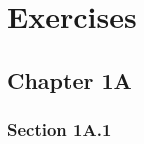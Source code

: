 \chapter{Exercises}
\label{+++ Chpt: Exercises} %


\section{Chapter 1A} \label{- Sec: Exercises 1A} 

\subsection{Section 1A.1} \label{-- Subsec: Exercises 1A.1}